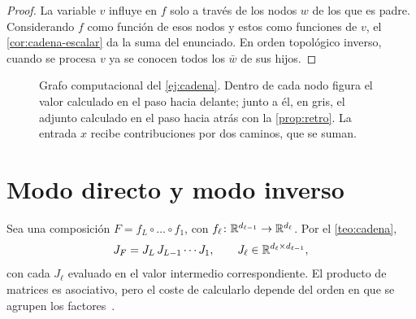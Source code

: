 \begin{proof}
La variable $v$ influye en $f$ solo a través de los nodos $w$ de los que es padre. Considerando $f$ como función de esos nodos y estos como funciones de $v$, el \cref{cor:cadena-escalar} da la suma del enunciado. En orden topológico inverso, cuando se procesa $v$ ya se conocen todos los $\bar w$ de sus hijos.
\end{proof}

\begin{figure}[h]
\centering
{}
\caption{Grafo computacional del \cref{ej:cadena}. Dentro de cada nodo figura el valor calculado en el paso hacia delante; junto a él, en gris, el adjunto calculado en el paso hacia atrás con la \cref{prop:retro}. La entrada $x$ recibe contribuciones por dos caminos, que se suman.}
\label{fig:grafo}
\end{figure}

\section{Modo directo y modo inverso}

Sea una composición $F=f_L\circ\dots\circ f_1$, con $f_\ell\colon\mathbb{R}^{d_{\ell-1}}\to\mathbb{R}^{d_\ell}$. Por el \cref{teo:cadena},
\[
J_F=J_L\,J_{L-1}\cdots J_1,\qquad J_\ell\in\mathbb{R}^{d_\ell\times d_{\ell-1}},
\]
con cada $J_\ell$ evaluado en el valor intermedio correspondiente. El producto de matrices es asociativo, pero el coste de calcularlo depende del orden en que se agrupen los factores~\cite[§5.6]{mml}.

